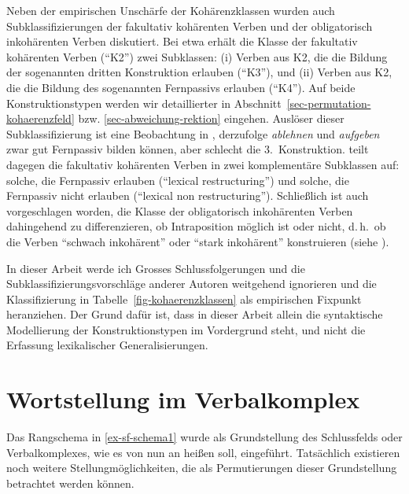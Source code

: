 Neben der empirischen Unschärfe der Kohärenzklassen wurden auch Subklassifizierungen der fakultativ kohärenten Verben und der obligatorisch inkohärenten Verben diskutiert. Bei \cite{Reis:Sternefeld:04} etwa erhält die Klasse der fakultativ kohärenten Verben ("`K2"') zwei Subklassen: (i) Verben aus K2, die die Bildung der sogenannten dritten Konstruktion erlauben ("`K3"'), und (ii) Verben aus K2, die die Bildung des sogenannten Fernpassivs erlauben ("`K4"'). Auf beide Konstruktionstypen werden wir detaillierter in Abschnitt~\ref{sec-permutation-kohaerenzfeld} bzw. \ref{sec-abweichung-rektion} eingehen. Auslöser dieser Subklassifizierung ist eine Beobachtung in \citet[318]{Woellstein:01}, derzufolge {\it ablehnen} und {\it aufgeben} zwar gut Fernpassiv bilden können, aber schlecht die 3.~Konstruktion. \cite{Wurmbrand:01} teilt dagegen die fakultativ kohärenten Verben in zwei komplementäre Subklassen auf: solche, die Fernpassiv erlauben ("`lexical restructuring"') und solche, die Fernpassiv nicht erlauben ("`lexical non restructuring"'). Schlie\ss lich ist auch vorgeschlagen worden, die Klasse der obligatorisch inkohärenten Verben dahingehend zu differenzieren, ob Intraposition möglich ist oder nicht, d.\,h.\ ob die Verben "`schwach inkohärent"' oder "`stark inkohärent"' konstruieren (siehe \citealt{Sternefeld:08}). 

In dieser Arbeit werde ich Grosses Schlussfolgerungen und die Subklassifizierungsvorschläge anderer Autoren  weitgehend ignorieren und die Klassifizierung in Tabelle~\ref{fig-kohaerenzklassen} als empirischen Fixpunkt heranziehen. Der Grund dafür ist, dass in dieser Arbeit allein die syntaktische Modellierung der Konstruktionstypen im Vordergrund steht, und nicht die Erfassung lexikalischer Generalisierungen. 




\section{Wortstellung im Verbalkomplex} \label{sec-verbalkomplex}

Das Rangschema in \ref{ex-sf-schema1} wurde als Grundstellung des Schlussfelds oder Verbalkomplexes, wie es von nun an hei\ss en soll, eingeführt. Tatsächlich existieren noch weitere Stellungmöglichkeiten, die als Permutierungen dieser Grundstellung betrachtet werden können. 

